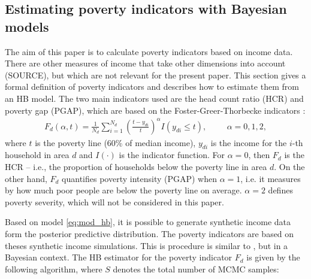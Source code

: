\subsection{Estimating poverty indicators with Bayesian models}

The aim of this paper is to calculate poverty indicators based on income data.
There are other measures of income that take other dimensions into account (SOURCE), but which are not relevant for the present paper.
This section gives a formal definition of poverty indicators and describes how to estimate them from an HB model.
The two main indicators used are the head count ratio (HCR) and poverty gap (PGAP), which
are based on the Foster-Greer-Thorbecke indicators \citep{foster_class_1984}:
\begin{gather*}
    F_d(\alpha, t) = \displaystyle \frac 1 {N_d} \sum_{i=1}^{N_d}\left( \frac{t - y_{di}}{t} \right)^\alpha I (y_{di} \le t),
    \hspace{1cm}\alpha = 0, 1, 2,
\end{gather*}
where $t$ is the poverty line (60\% of median income), $y_{di}$ is the income for the $i$-th household in area $d$ and $I(\cdot)$ is the indicator function.
For $\alpha = 0$, then $F_d$ is the HCR – i.e., the proportion of households below the poverty line in area $d$.
On the other hand, $F_d$ quantifies poverty intensity (PGAP) when $\alpha = 1$, i.e. it measures by how much poor people are below the poverty line on average.
$\alpha = 2$ defines poverty severity, which will not be considered in this paper.

Based on model \ref{eq:mod_hb}, it is possible to generate synthetic income data form the posterior predictive distribution.
The poverty indicators are based on theses synthetic income simulations.
This is procedure is similar to \cite{rojas_perilla_data_2020}, but in a Bayesian context.
The HB estimator for the poverty indicator $F_d$ is given by the following algorithm, where $S$ denotes the total number of MCMC samples: \\


